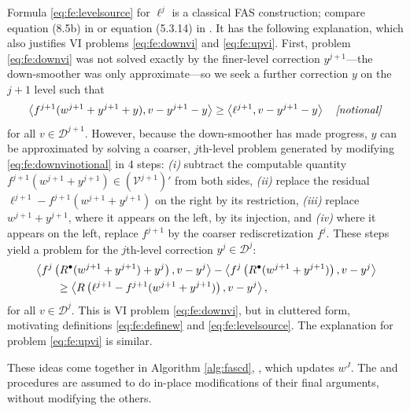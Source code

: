 \documentclass[review,hidelinks,onefignum,onetabnum]{siamart220329}
\newcommand{\ip}[2]{\left<#1,#2\right>}
\newcommand{\iR}{R^{\bullet}}
\begin{document}
Formula \eqref{eq:fe:levelsource} for $\ell^j$ is a classical FAS construction; compare equation (8.5b) in \cite{BrandtLivne2011} or equation (5.3.14) in \cite{Trottenbergetal2001}.  It has the following explanation, which also justifies VI problems \eqref{eq:fe:downvi} and \eqref{eq:fe:upvi}.  First, problem \eqref{eq:fe:downvi} was not solved exactly by the finer-level correction $y^{j+1}$---the down-smoother was only approximate---so we seek a further correction $y$ on the $j+1$ level such that
\begin{equation}
\ip{f^{j+1}(w^{j+1}+y^{j+1}+y)}{v-y^{j+1}-y} \ge \ip{\ell^{j+1}}{v-y^{j+1}-y} \quad \text{\emph{[notional]}} \label{eq:fe:downvinotional}
\end{equation}
for all $v\in \mathcal{D}^{j+1}$.  However, because the down-smoother has made progress, $y$ can be approximated by solving a coarser, $j$th-level problem generated by modifying \eqref{eq:fe:downvinotional} in 4 steps: \emph{(i)} subtract the computable quantity $f^{j+1}(w^{j+1}+y^{j+1}) \in (\mathcal{V}^{j+1})'$ from both sides, \emph{(ii)} replace the residual $\ell^{j+1}-f^{j+1}(w^{j+1}+y^{j+1})$ on the right by its restriction, \emph{(iii)} replace $w^{j+1}+y^{j+1}$, where it appears on the left, by its injection, and \emph{(iv)} where it appears on the left, replace $f^{j+1}$ by the coarser rediscretization $f^j$.  These steps yield a problem for the $j$th-level correction $y^j \in \mathcal{D}^j$:
\begin{align}
&\ip{f^j\left(\iR(w^{j+1}+y^{j+1})+y^j\right)}{v-y^j} - \ip{f^j\left(\iR(w^{j+1}+y^{j+1})\right)}{v-y^j} \label{eq:fe:downvicluttered} \\
&\qquad \ge \ip{R\left(\ell^{j+1}-f^{j+1}(w^{j+1}+y^{j+1})\right)}{v-y^j}, \notag
\end{align}
for all $v\in \mathcal{D}^{j}$.  This is VI problem \eqref{eq:fe:downvi}, but in cluttered form, motivating definitions \eqref{eq:fe:definew} and \eqref{eq:fe:levelsource}.  The explanation for problem \eqref{eq:fe:upvi} is similar.

These ideas come together in Algorithm \ref{alg:fascd}, , which updates $w^J$.  The  and  procedures are assumed to do in-place modifications of their final arguments, without modifying the others.
\end{document}
